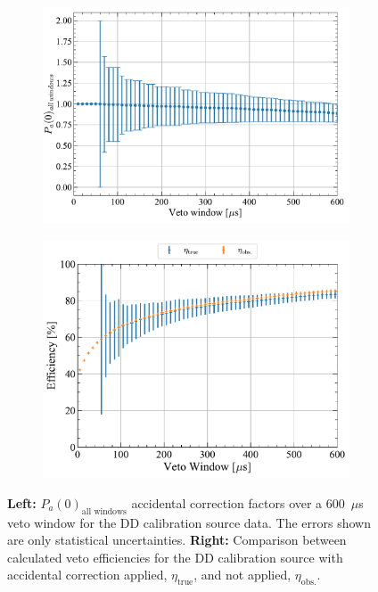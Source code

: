 \begin{figure}[!ht]
    \centering
    \begin{subfigure}[b]{0.49\textwidth}
        \centering
        \includegraphics[width=\textwidth]{figures/VetoEfficiency/SR3DDdirect_Corrections_100k.pdf}
        \caption{}
        \label{fig:VetoEff/DDAccCorrectionParameters}
    \end{subfigure}
    \hfill
    \begin{subfigure}[b]{0.49\textwidth}
        \centering
        \includegraphics[width=\textwidth]{figures/VetoEfficiency/DDAccidentalCheck.pdf}
        \caption{}
        \label{fig:VetoEff/DDAccCorrectionImpact_P0}
    \end{subfigure}
    \caption{\textbf{Left:} $P_a(0)_{\text{all windows}}$ accidental correction factors over a 600~$\mu$s veto window for the DD calibration source data. The errors shown are only statistical uncertainties. \textbf{Right:} Comparison between calculated veto efficiencies for the DD calibration source with accidental correction applied, $\eta_\text{true}$, and not applied, $\eta_\text{obs.}$.}
    \label{fig:VetoEff/DDAccidentalPlots}
\end{figure}

